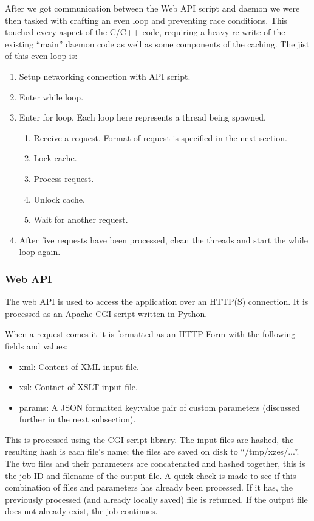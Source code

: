 After we got communication between the Web API script and daemon we were then tasked with crafting an even loop and preventing race conditions.
This touched every aspect of the C/C++ code, requiring a heavy re-write of the existing ``main'' daemon code as well as some components of the caching.
The jist of this even loop is:

\begin{enumerate}
  \item Setup networking connection with API script.
  \item Enter while loop.
  \item Enter for loop. Each loop here represents a thread being spawned.
  \begin{enumerate}
    \item Receive a request. Format of request is specified in the next section.
    \item Lock cache.
    \item Process request.
    \item Unlock cache.
    \item Wait for another request.
  \end{enumerate}
  \item After five requests have been processed, clean the threads and start the while loop again.
\end{enumerate}

\subsubsection{Web API}

The web API is used to access the application over an HTTP(S) connection.
It is processed as an Apache CGI script written in Python.

When a request comes it it is formatted as an HTTP Form with the following fields and values:

\begin{itemize}
  \item xml: Content of XML input file.
  \item xsl: Contnet of XSLT input file.
  \item params: A JSON formatted key:value pair of custom parameters (discussed further in the next subsection).
\end{itemize}

This is processed using the CGI script library.
The input files are hashed, the resulting hash is each file's name; the files are saved on disk to ``/tmp/xzes/...''.
The two files and their parameters are concatenated and hashed together, this is the job ID and filename of the output file.
A quick check is made to see if this combination of files and parameters has already been processed.
If it has, the previously processed (and already locally saved) file is returned.
If the output file does not already exist, the job continues.

